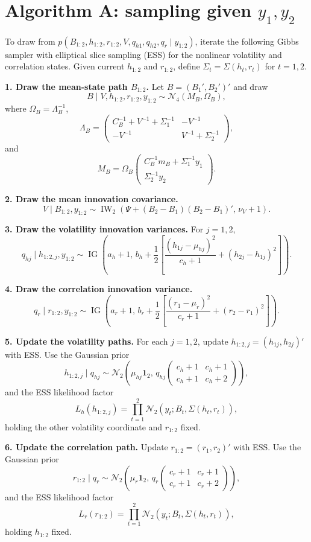 \documentclass[10pt,a4paper]{article}
\newcommand{\N}{\mathcal N}
\newcommand{\IG}{\operatorname{IG}}
\newcommand{\IW}{\operatorname{IW}}
\begin{document}
\section*{Algorithm A: sampling given $y_1,y_2$}

To draw from
$p(B_{1:2},h_{1:2},r_{1:2},V,q_{h1},q_{h2},q_r\mid y_{1:2})$,
iterate the following Gibbs sampler with elliptical slice sampling (ESS) for the nonlinear
volatility and correlation states. Given current $h_{1:2}$ and $r_{1:2}$, define
$\Sigma_t=\Sigma(h_t,r_t)$ for $t=1,2$.

\textbf{1. Draw the mean-state path $B_{1:2}$.}
Let $B=(B_1',B_2')'$ and draw
\[
  B\mid V,h_{1:2},r_{1:2},y_{1:2}\sim \N_4(M_B,\Omega_B),
\]
where $\Omega_B=\Lambda_B^{-1}$,
\[
\Lambda_B=
\begin{pmatrix}
C_B^{-1}+V^{-1}+\Sigma_1^{-1} & -V^{-1}\\
-V^{-1} & V^{-1}+\Sigma_2^{-1}
\end{pmatrix},
\]
and
\[
M_B=\Omega_B
\begin{pmatrix}
C_B^{-1}m_B+\Sigma_1^{-1}y_1\\
\Sigma_2^{-1}y_2
\end{pmatrix}.
\]

\textbf{2. Draw the mean innovation covariance.}
\[
V\mid B_{1:2},y_{1:2}
\sim
\IW_2\!\left(\Psi+(B_2-B_1)(B_2-B_1)',\,\nu_V+1\right).
\]

\textbf{3. Draw the volatility innovation variances.} For $j=1,2$,
\[
q_{hj}\mid h_{1:2,j},y_{1:2}
\sim
\IG\!\left(a_h+1,\,
b_h+\frac12\left[
\frac{(h_{1j}-\mu_{hj})^2}{c_h+1}
+(h_{2j}-h_{1j})^2
\right]\right).
\]

\textbf{4. Draw the correlation innovation variance.}
\[
q_r\mid r_{1:2},y_{1:2}
\sim
\IG\!\left(a_r+1,\,
b_r+\frac12\left[
\frac{(r_1-\mu_r)^2}{c_r+1}
+(r_2-r_1)^2
\right]\right).
\]

\textbf{5. Update the volatility paths.}
For each $j=1,2$, update $h_{1:2,j}=(h_{1j},h_{2j})'$ with ESS. Use the Gaussian
prior
\[
h_{1:2,j}\mid q_{hj}\sim
\N_2\!\left(\mu_{hj}\mathbf 1_2,\,
q_{hj}\begin{pmatrix}c_h+1&c_h+1\\ c_h+1&c_h+2\end{pmatrix}\right),
\]
and the ESS likelihood factor
\[
L_h(h_{1:2,j})=
\prod_{t=1}^2
\N_2\!\left(y_t;B_t,\Sigma(h_t,r_t)\right),
\]
holding the other volatility coordinate and $r_{1:2}$ fixed.

\textbf{6. Update the correlation path.}
Update $r_{1:2}=(r_1,r_2)'$ with ESS. Use the Gaussian prior
\[
r_{1:2}\mid q_r\sim
\N_2\!\left(\mu_r\mathbf 1_2,\,
q_r\begin{pmatrix}c_r+1&c_r+1\\ c_r+1&c_r+2\end{pmatrix}\right),
\]
and the ESS likelihood factor
\[
L_r(r_{1:2})=
\prod_{t=1}^2
\N_2\!\left(y_t;B_t,\Sigma(h_t,r_t)\right),
\]
holding $h_{1:2}$ fixed.
\end{document}
